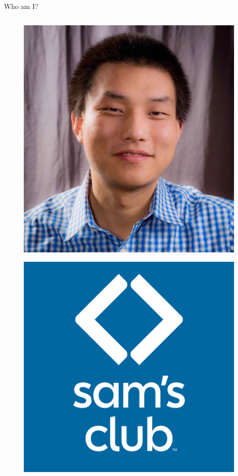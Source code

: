 \documentclass[aspectratio=169,xcolor=x11names,table]{beamer}
\begin{document}
\begin{frame}{Who am I?}
\begin{columns}
\begin{column}{0.2\linewidth}
\begin{figure}
				\includegraphics[width=\columnwidth]{lijun}
			\end{figure}
			\vspace{2mm}
			\begin{figure}
				\centering
				\includegraphics[width=\columnwidth]{sams_logo}
			\end{figure}
		\end{column}
	\end{columns}
\end{frame}
\end{document}
